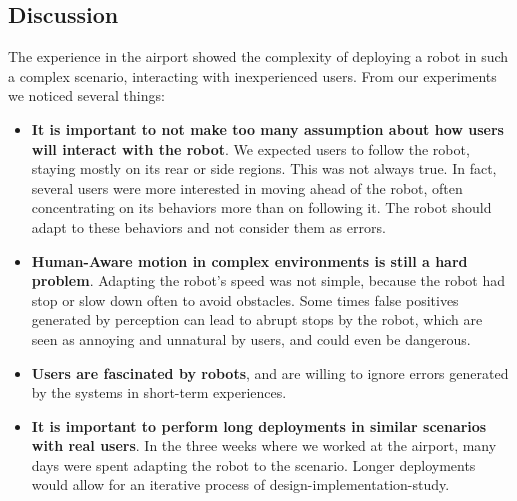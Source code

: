 \subsection{Discussion}
\label{subsec:spencer_results-discussion}
The experience in the airport showed the complexity of deploying a robot in such a complex scenario, interacting with inexperienced users. From our experiments we noticed several things:
\begin{itemize}
\item \textbf{It is important to not make too many assumption about how users will interact with the robot}. We expected users to follow the robot, staying mostly on its rear or side regions. This was not always true. In fact, several users were more interested in moving ahead of the robot, often concentrating on its behaviors more than on following it. The robot should adapt to these behaviors and not consider them as errors.
\item \textbf{Human-Aware motion in complex environments is still a hard problem}. Adapting the robot's speed was not simple, because the robot had stop or slow down often to avoid obstacles. Some times false positives generated by perception can lead to abrupt stops by the robot, which are seen as annoying and unnatural by users, and could even be dangerous.
\item \textbf{Users are fascinated by robots}, and are willing to ignore errors generated by the systems in short-term experiences.
\item \textbf{It is important to perform long deployments in similar scenarios with real users}. In the three weeks where we worked at the airport, many days were spent adapting the robot to the scenario. Longer deployments would allow for an iterative process of design-implementation-study.
\end{itemize}
